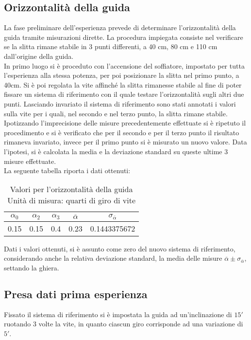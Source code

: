 \documentclass[a4paper,11pt,oneside]{article}
\begin{document}
\subsection{Orizzontalità della guida}
La fase preliminare dell'esperienza prevede di determinare l'orizzontalità della guida tramite misurazioni dirette. La procedura impiegata consiste nel verificare se la slitta rimane stabile in 3 punti differenti, a 40 cm, 80 cm e 110 cm dall'origine della guida.\\
In primo luogo si è proceduto con l'accensione del soffiatore, impostato per tutta l'esperienza alla stessa potenza, per poi posizionare la slitta nel primo punto, a 40cm. Si è poi regolata la vite affinché la slitta rimanesse stabile al fine di poter fissare un sistema di riferimento con il quale testare l'orizzontalità sugli altri due punti. Lasciando invariato il sistema di riferimento sono stati annotati i valori sulla vite per i quali, nel secondo  e nel terzo punto, la slitta rimane stabile.\\
Ipotizzando l'imprecisione delle misure precedentemente effettuate si è ripetuto il procedimento e si è verificato che per il secondo e per il terzo punto il risultato rimaneva invariato, invece per il primo punto si è misurato un nuovo valore. Data l'ipotesi, si è calcolata la media e la deviazione standard su queste ultime 3 misure effettuate.\\
La seguente tabella riporta i dati ottenuti:

\begin{table}[h!]
    \centering
    \caption{Valori per l'orizzontalità della guida \\ Unità di misura: quarti di giro di vite}
\begin{tabular}{ccc|cc}
    \toprule
    $\alpha_{0}$&$\alpha_{2}$&$\alpha_{3}$&$\overline{\alpha}$&$\sigma_{\overline{\alpha}}$\\
    \midrule
    0.15&0.15&0.4&0.23&0.1443375672 \\
    \bottomrule
    \end{tabular}
    \label{tab:guida_orizzontale}
\end{table}

Dati i valori ottenuti, si è assunto come zero del nuovo sistema di riferimento, considerando anche la relativa deviazione standard, la media delle misure $\overline{\alpha} \pm \sigma_{\overline{\alpha}}$, settando la ghiera.\\


\subsection{Presa dati prima esperienza}
Fissato il sistema di riferimento si è impostata la guida ad un'inclinazione di $15'$ ruotando 3 volte la vite, in quanto ciascun giro corrisponde ad una variazione  di $5'$.\\
\end{document}
